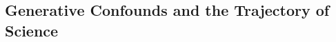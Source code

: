 \documentclass[11pt, oneside]{article}   	%
\begin{document}


\subsection{Generative Confounds and the Trajectory of Science}




\end{document}
